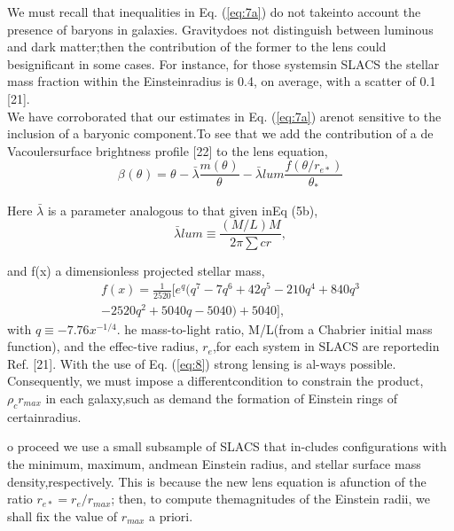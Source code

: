 \documentclass[10pt,a4paper]{article}
\begin{document}
\begin{multicols}{2}
\indent
We must recall that inequalities in Eq.  (\ref{eq:7a}) do not takeinto account the presence of baryons in galaxies.  Gravitydoes not distinguish between luminous and dark matter;then the contribution of the former to the lens could besignificant in some cases.  For instance, for those systemsin SLACS the stellar mass fraction within the Einsteinradius is 0.4, on average, with a scatter of 0.1 [21].\\
\indent
We have corroborated that our estimates in Eq. (\ref{eq:7a}) arenot sensitive to the inclusion of a baryonic component.To  see  that  we  add  the  contribution  of  a  de  Vacoulersurface brightness profile [22] to the lens equation,
\begin{equation}\label{eq:8a}\tag{8.a}
	\beta_{}(\theta_{})=\theta_{}-\bar{\lambda} \frac{m(\theta_{})}{\theta_{}}-\bar{\lambda}{lum} \frac{f(\theta{}/r_{e*})}{\theta_{*}}
\end{equation}

 Here \(\bar\lambda\) is  a  parameter  analogous  to  that  given  inEq (5b),
\begin{equation}\tag{8b}
	\bar{\lambda}{lum}\equiv \frac{(M/L)M}{2\pi\sum{cr}}, 
\end{equation} 

and f(x) a dimensionless projected stellar mass,
\begin{multline*}\tag{8c}
	 f(x)=\frac{1}{2520}[e^{q}(q^{7}-7q^{6}+42q^{5}-210q^{4}+840q^{3} \\ -2520q^{2}+5040q-5040)+5040],
\end{multline*}
with $q\equiv -7.76x^{-1/4}$. he  mass-to-light  ratio, M/L(from  a  Chabrier  initial  mass  function),  and  the  effec-tive radius, \(r_{e}\),for each system in SLACS are reportedin Ref. [21].  With the use of Eq.  (\ref{eq:8}) strong lensing is al-ways possible.  Consequently, we must impose a differentcondition to constrain the product, $\rho_{c}r_{max}$ in each galaxy,such as demand the formation of Einstein rings of certainradius.

o proceed we use a small subsample of SLACS that in-cludes configurations with the minimum, maximum, andmean  Einstein  radius,  and  stellar  surface  mass  density,respectively.  This is because the new lens equation is afunction of the ratio $r_{e*}=r_{e}/r_{max}$; then, to compute themagnitudes of the Einstein radii, we shall fix the value of $r_{max}$ a priori. 


\end{multicols}
\end{document}
